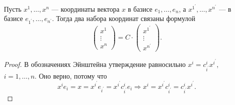 \begin{theorem}
    Пусть $x^1, \ldots, x^n$ --- координаты вектора $x$ в базисе $e_1, \ldots, e_n$, а $x^{1^\prime}, \ldots, x^{n^\prime}$ --- в базисе $e_{1^\prime}, \ldots, e_{n^\prime}$. Тогда два набора координат связаны формулой
    \[
        \begin{pmatrix}
            x^1\\
            \vdots\\
            x^n
        \end{pmatrix} = C \cdot 
        \begin{pmatrix}
            x^{1^\prime}\\
            \vdots\\
            x^{n^\prime}
        \end{pmatrix}.
    \]
\end{theorem}

\begin{proof}
    В обозначениях Эйнштейна утверждение равносильно $x^i = c^i_{i^\prime}x^{i^\prime}$, $i = 1, \ldots, n$. Оно верно, потому что
    \[
        x^ie_i = x = x^{i^\prime}e_{i^\prime} = x^{i^\prime}c^i_{i^\prime}e_i \Rightarrow x^i = x^{i^\prime}c^i_{i^\prime} = c^i_{i^\prime}x^{i^\prime}.
    \]
\end{proof}

